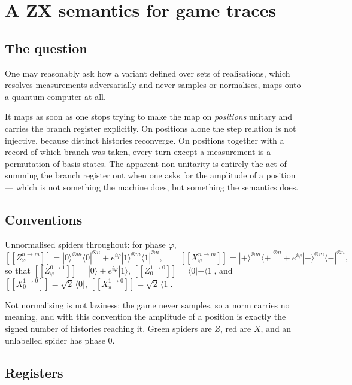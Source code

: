 \documentclass[11pt,a4paper]{article}
\theoremstyle{definition}
\theoremstyle{plain}
\newcommand{\lbr}{[\![}
\newcommand{\rbr}{]\!]}
\newcommand{\gr}[1]{\lbr #1 \rbr}
\begin{document}
\section{A ZX semantics for game traces}
\label{app:zx}

\subsection{The question}

One may reasonably ask how a variant defined over sets of realisations, which
resolves measurements adversarially and never samples or normalises, maps onto a
quantum computer at all.

It maps as soon as one stops trying to make the map on \emph{positions} unitary
and carries the branch register explicitly. On positions alone the step relation
is not injective, because distinct histories reconverge. On positions together
with a record of which branch was taken, every turn except a measurement is a
permutation of basis states. The apparent non-unitarity is entirely the act of
summing the branch register out when one asks for the amplitude of a position
--- which is not something the machine does, but something the semantics does.

\subsection{Conventions}

Unnormalised spiders throughout: for phase $\varphi$,
\[
  \gr{Z^{n\to m}_\varphi}
  = |0\rangle^{\otimes m}\langle 0|^{\otimes n}
  + e^{i\varphi}|1\rangle^{\otimes m}\langle 1|^{\otimes n},
  \qquad
  \gr{X^{n\to m}_\varphi}
  = |{+}\rangle^{\otimes m}\langle{+}|^{\otimes n}
  + e^{i\varphi}|{-}\rangle^{\otimes m}\langle{-}|^{\otimes n},
\]
so that $\gr{Z^{0\to1}_\varphi} = |0\rangle + e^{i\varphi}|1\rangle$,
$\gr{Z^{1\to0}_0} = \langle 0| + \langle 1|$, and
$\gr{X^{1\to0}_0} = \sqrt2\,\langle 0|$,
$\gr{X^{1\to0}_\pi} = \sqrt2\,\langle 1|$.

Not normalising is not laziness: the game never samples, so a norm carries no
meaning, and with this convention the amplitude of a position is exactly the
signed number of histories reaching it. Green spiders are $Z$, red are $X$, and
an unlabelled spider has phase $0$.

\subsection{Registers}
\end{document}
